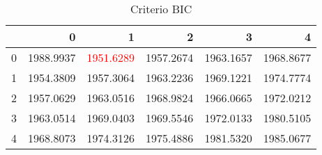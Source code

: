 \begin{table}[H]
\label{tab:autoarima_bic}
\centering
\begin{tabular}{lrrrrr}
\toprule
 & 0 & 1 & 2 & 3 & 4 \\
\midrule
0 & 1988.9937 & \textcolor{red}{1951.6289} & 1957.2674 & 1963.1657 & 1968.8677 \\
1 & 1954.3809 & 1957.3064 & 1963.2236 & 1969.1221 & 1974.7774 \\
2 & 1957.0629 & 1963.0516 & 1968.9824 & 1966.0665 & 1972.0212 \\
3 & 1963.0514 & 1969.0403 & 1969.5546 & 1972.0133 & 1980.5105 \\
4 & 1968.8073 & 1974.3126 & 1975.4886 & 1981.5320 & 1985.0677 \\
\bottomrule
\end{tabular}
\caption{Criterio BIC}
\end{table}
